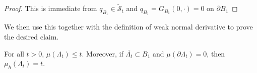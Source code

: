 \documentclass[12pt]{amsart}
\numberwithin{equation}{section}
\newcommand{\mclSshift}[2]{\hyperref[eq:shifted-supersolutions]{\mathcal{\tilde{S}}^{#1}_{#2}}}
\newcommand{\lssshift}[2]{\hyperref[eq:appendix-least-supersolution]{\tilde{w}^{#1}_{#2}}}
\newcommand{\cluster}[2]{\hyperref[eq:non-co-set]{\mathit{\Lambda}^{#1}_{#2}}}
\newcommand{\odometer}[2]{\hyperref[eq:limit-odometer]{v^{#1}_{#2}}}
\begin{document}
	\begin{proof}
		This is immediate from $q_{B_1} \in  \mclSshift{}{t}$ and $q_{B_1} = G_{B_1}(0,\cdot) = 0$ on $\partial B_1$
	\end{proof}
	
	
	We then use this together with the definition of weak normal derivative to prove the desired claim. 
	\begin{lemma} \label{lemma:appendix-conservation-of-mass}
		For all $t > 0$, $\mu({\cluster{}{t}}) \leq t$. Moreover, if $\overline{{{\cluster{}{t}}}} \subset B_1$ and $\mu(\partial {\cluster{}{t}}) = 0$, then $\mu_h({\cluster{}{t}}) = t$.
	\end{lemma}
	
	
	
\end{document}
